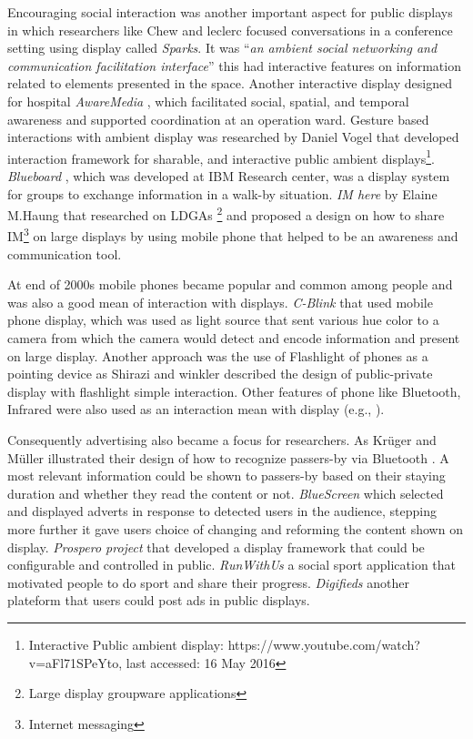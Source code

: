 Encouraging social interaction was another important aspect for public displays in which researchers like Chew and leclerc \cite{chew_interaction} focused conversations in a conference setting using display called \emph{Sparks}. It was ``\emph{an ambient social networking and communication facilitation interface}'' this had interactive features on information related to elements presented in the space. Another interactive display designed for hospital \emph{AwareMedia} \cite{ interactive_hospital}, which facilitated  social, spatial, and temporal awareness and supported coordination at an operation ward. Gesture based interactions with ambient display was researched by Daniel Vogel \cite{vogel} that developed interaction framework for sharable, and interactive public ambient displays\footnote{Interactive Public ambient display:  https://www.youtube.com/watch?v=aFl71SPeYto, last accessed: 16 May 2016}. \emph{Blueboard} \cite{blueboard}, which was developed at IBM Research center, was a display system for groups to exchange information in a walk-by situation. \emph{IM here} \cite{ imahere} by Elaine M.Haung that researched on LDGAs \footnote{Large display groupware applications} and proposed a design on how to share IM\footnote{Internet messaging} on large displays by using mobile phone that helped to be an awareness and communication tool.

At end of 2000s mobile phones became popular and common among people and was also a good mean of interaction with displays. \emph{C-Blink} \cite{cblink} that used mobile phone display, which was used as light source that sent various hue color to a camera from which the camera would detect and encode information and present on large display. Another approach was the use of Flashlight of phones as a pointing device as Shirazi and winkler \cite{flashlight} described the design of public-private display with flashlight simple interaction. Other features of phone like Bluetooth, Infrared were also used as an interaction mean with display (e.g., \cite{bluetooth2, Bluetooth}).

Consequently advertising also became a focus for researchers. As Krüger and Müller illustrated their design of how to recognize passers-by via Bluetooth \cite{toward_situated}. A most relevant information could be shown to passers-by based on their staying duration and whether they read the content or not. \emph{BlueScreen} \cite{bluescreen} which selected and displayed adverts in response to detected users in the audience, stepping more further it gave users choice of changing and reforming the content shown on display. \emph{Prospero project} \cite{prospero} that developed a display framework that could be configurable and controlled in public.  \emph{RunWithUs} \cite{runwithuse} a social sport application that motivated people to do sport and share their progress. \emph{Digifieds} \cite{digifieds} another plateform that users could post ads in public displays.



